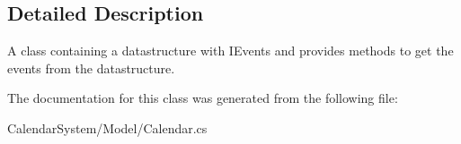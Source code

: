 \subsection{Detailed Description}
A class containing a datastructure with I\+Events and provides methods to get the events from the datastructure. 



The documentation for this class was generated from the following file\+:\begin{DoxyCompactItemize}
\item 
Calendar\+System/\+Model/Calendar.\+cs\end{DoxyCompactItemize}
